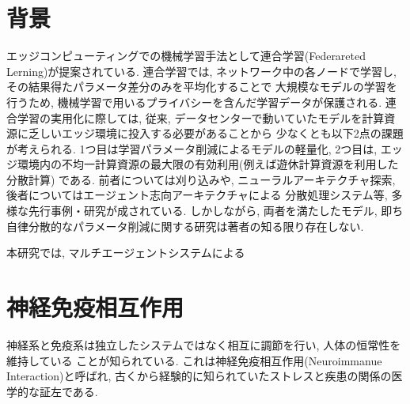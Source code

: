 \documentclass[a4paper,10.5pt,twocolumn]{jsarticle}
\begin{document}


\graphicspath{{./figs/}} %

\section{背景}
\begin{comment}
本来的に大規模な計算資源を必要とするニューラルネットワークが
今日, あらゆる産業へ導入されるに至ったのは, クラウドコンピューティングの貢献がある.
一方で, 同市場拡大に伴って
プラットフォーマによる市場寡占, データセンターでの電力消費, データプライバシーの課題が表面化した.
こうしたクラウドの課題克服に向けて, 
データを集約せずにネットワークの端点(エッジ)で処理するエッジコンピューティングが注目
されている.
\end{comment}
エッジコンピューティングでの機械学習手法として連合学習(Federareted Lerning)が提案されている.
連合学習では, ネットワーク中の各ノードで学習し, その結果得たパラメータ差分のみを平均化することで
大規模なモデルの学習を行うため, 機械学習で用いるプライバシーを含んだ学習データが保護される.
連合学習の実用化に際しては, 
従来, データセンターで動いていたモデルを計算資源に乏しいエッジ環境に投入する必要があることから
少なくとも以下2点の課題が考えられる.
1つ目は学習パラメータ削減によるモデルの軽量化, 
2つ目は, エッジ環境内の不均一計算資源の最大限の有効利用(例えば遊休計算資源を利用した分散計算)
である.
前者については刈り込みや, ニューラルアーキテクチャ探索, 後者についてはエージェント志向アーキテクチャによる
分散処理システム等, 多様な先行事例・研究が成されている. 
しかしながら, 両者を満たしたモデル,
即ち自律分散的なパラメータ削減に関する研究は著者の知る限り存在しない.

本研究では, マルチエージェントシステムによる
\section{神経免疫相互作用}
神経系と免疫系は独立したシステムではなく相互に調節を行い, 人体の恒常性を維持している
ことが知られている.
これは神経免疫相互作用(Neuroimmanue Interaction)と呼ばれ, 
古くから経験的に知られていたストレスと疾患の関係の医学的な証左である.
\end{document}
